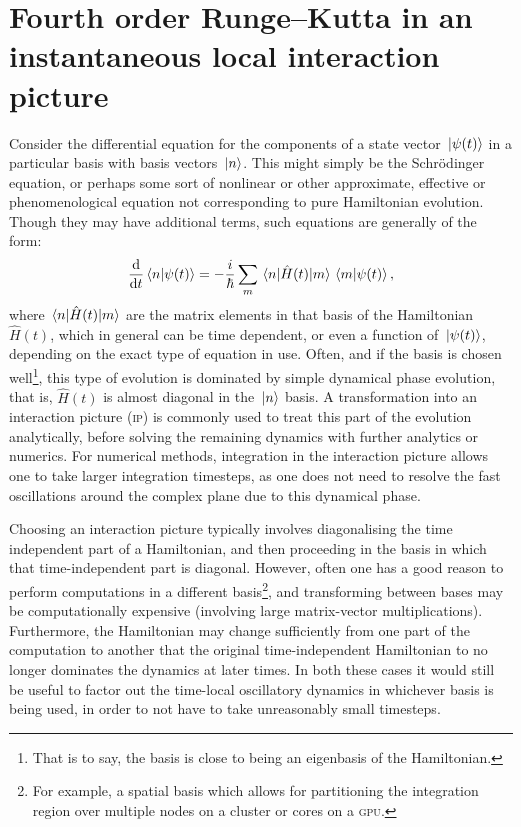 \setcounter{section}{5}
\section{Fourth order Runge--Kutta in an instantaneous local interaction picture}

Consider the differential equation for the components of a state vector $\ket{\psi(t)}$ in a particular basis with basis vectors $\ket{n}$. This might simply be the Schr\"odinger equation, or perhaps some sort of nonlinear or other approximate, effective or phenomenological equation not corresponding to pure Hamiltonian evolution. Though they may have additional terms, such equations are generally of the form:
\begin{align}\label{eq:real_imag}
\dv t \braket{n}{\psi(t)} = -\frac i \hbar \sum_m \matrixel{n}{\hat H(t)}{m} \braket{m}{\psi(t)},
\end{align}
where $\matrixel{n}{\hat H(t)}{m}$ are the matrix elements in that basis of the Hamiltonian $\hat H(t)$, which in general can be time dependent, or even a function of $\ket{\psi(t)}$, depending on the exact type of equation in use. Often, and if the basis is chosen well\footnote{That is to say, the basis is close to being an eigenbasis of the Hamiltonian.}, this type of evolution is dominated by simple dynamical phase evolution, that is, $\hat H(t)$ is almost diagonal in the $\ket{n}$ basis. A transformation into an interaction picture (\textsc{ip}) is commonly used to treat this part of the evolution analytically, before solving the remaining dynamics with further analytics or numerics. For numerical methods, integration in the interaction picture allows one to take larger integration timesteps, as one does not need to resolve the fast oscillations around the complex plane due to this dynamical phase.

Choosing an interaction picture typically involves diagonalising the time independent part of a Hamiltonian, and then proceeding in the basis in which that time-independent part is diagonal. However, often one has a good reason to perform computations in a different basis\footnote{For example, a spatial basis which allows for partitioning the integration region over multiple nodes on a cluster or cores on a \textsc{gpu}.}, and transforming between bases may be computationally expensive (involving large matrix-vector multiplications). Furthermore, the Hamiltonian may change sufficiently from one part of the computation to another that the original time-independent Hamiltonian to no longer dominates the dynamics at later times. In both these cases it would still be useful to factor out the time-local oscillatory dynamics in whichever basis is being used, in order to not have to take unreasonably small timesteps.

